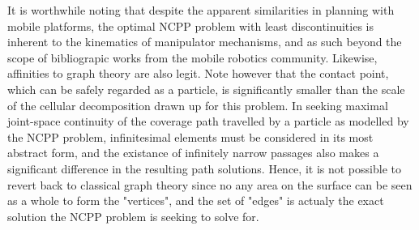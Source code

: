 \documentclass[conference]{IEEEtran}
\begin{document}
It is worthwhile noting that despite the apparent similarities in planning with mobile platforms, the optimal NCPP problem with least discontinuities 
is inherent to the kinematics of manipulator mechanisms, and as such beyond the scope of bibliograpic works from the mobile robotics community.
Likewise, affinities to graph theory are also legit. Note however that the contact point, which can be safely regarded as a particle, 
is significantly smaller than the scale of the cellular decomposition drawn up for this problem. 
In seeking maximal joint-space continuity of the coverage path travelled by a particle as modelled by the NCPP problem, 
infinitesimal elements must be considered in its most abstract form, and the existance of infinitely narrow passages also 
makes a significant difference in the resulting path solutions. %
Hence, it is not possible to revert back to classical graph theory since no any area on the surface can be seen as a whole to form the "vertices", 
and the set of "edges" is actualy the exact solution the NCPP problem is seeking to solve for. 
\end{document}
